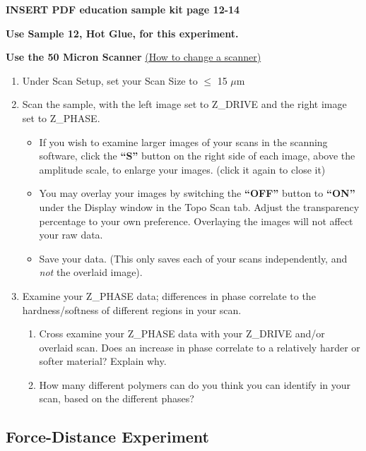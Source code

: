 \documentclass{../lab}
\begin{document}
\textbf{INSERT PDF education sample kit page 12-14}

\textbf{Use Sample 12, Hot Glue, for this experiment.}

\textbf{Use the 50 Micron Scanner} \hyperref[subsec:ChangingScanners]{(How to change a scanner)}

\begin{enumerate}
    \item Under Scan Setup, set your Scan Size to $\leq$ 15 $\mu$m

    \item Scan the sample, with the left image set to Z\_DRIVE and the right image set to Z\_PHASE.

    \begin{itemize}
        \item If you wish to examine larger images of your scans in the scanning software, click the \textbf{``S''} button on the right side of each image, above the amplitude scale, to enlarge your images.  (click it again to close it)

        \item You may overlay your images by switching the\textbf{ ``OFF''} button to \textbf{``ON''} under the Display window in the Topo Scan tab.  Adjust the transparency percentage to your own preference.  Overlaying the images will not affect your raw data.

        \item Save your data. (This only saves each of your scans independently, and \emph{not} the overlaid image).
    \end{itemize}

    \item Examine your Z\_PHASE data; differences in phase correlate to the hardness/softness of different regions in your scan.

    \begin{enumerate}
        \item Cross examine your Z\_PHASE data with your Z\_DRIVE and/or overlaid scan.  Does an increase in phase correlate to a relatively harder or softer material? Explain why.

        \item How many different polymers can do you think you can identify in your scan, based on the different phases?
    \end{enumerate}

\end{enumerate}

\subsection{Force-Distance Experiment}
\label{subsec:ForceDistance}
\end{document}
